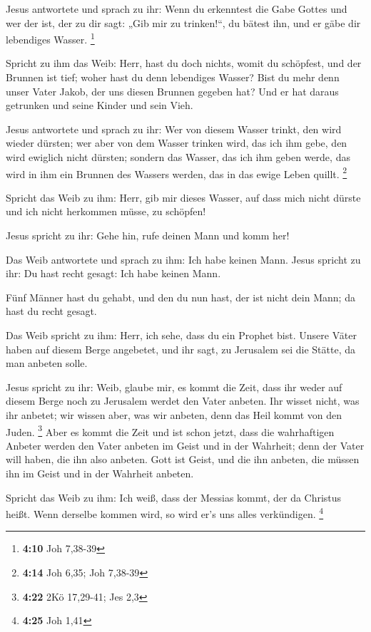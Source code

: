  Jesus antwortete und sprach zu ihr: Wenn du erkenntest
die Gabe Gottes und wer der ist, der zu dir sagt: „Gib mir zu
trinken!{}``, du bätest ihn, und er gäbe dir lebendiges Wasser.
\footnote{\textbf{4:10} Joh 7,38-39}

 Spricht zu ihm das Weib: Herr, hast du doch nichts,
womit du schöpfest, und der Brunnen ist tief; woher hast du denn
lebendiges Wasser?  Bist du mehr denn unser Vater Jakob,
der uns diesen Brunnen gegeben hat? Und er hat daraus getrunken und
seine Kinder und sein Vieh.

 Jesus antwortete und sprach zu ihr: Wer von diesem
Wasser trinkt, den wird wieder dürsten;  wer aber von dem
Wasser trinken wird, das ich ihm gebe, den wird ewiglich nicht dürsten;
sondern das Wasser, das ich ihm geben werde, das wird in ihm ein Brunnen
des Wassers werden, das in das ewige Leben quillt. \footnote{\textbf{4:14}
  Joh 6,35; Joh 7,38-39}

 Spricht das Weib zu ihm: Herr, gib mir dieses Wasser,
auf dass mich nicht dürste und ich nicht herkommen müsse, zu schöpfen!

 Jesus spricht zu ihr: Gehe hin, rufe deinen Mann und
komm her!

 Das Weib antwortete und sprach zu ihm: Ich habe keinen
Mann. Jesus spricht zu ihr: Du hast recht gesagt: Ich habe keinen Mann.

 Fünf Männer hast du gehabt, und den du nun hast, der ist
nicht dein Mann; da hast du recht gesagt.

 Das Weib spricht zu ihm: Herr, ich sehe, dass du ein
Prophet bist.  Unsere Väter haben auf diesem Berge
angebetet, und ihr sagt, zu Jerusalem sei die Stätte, da man anbeten
solle.

 Jesus spricht zu ihr: Weib, glaube mir, es kommt die
Zeit, dass ihr weder auf diesem Berge noch zu Jerusalem werdet den Vater
anbeten.  Ihr wisset nicht, was ihr anbetet; wir wissen
aber, was wir anbeten, denn das Heil kommt von den Juden. \footnote{\textbf{4:22}
  2Kö 17,29-41; Jes 2,3}  Aber es kommt die Zeit und ist
schon jetzt, dass die wahrhaftigen Anbeter werden den Vater anbeten im
Geist und in der Wahrheit; denn der Vater will haben, die ihn also
anbeten.  Gott ist Geist, und die ihn anbeten, die müssen
ihn im Geist und in der Wahrheit anbeten.

 Spricht das Weib zu ihm: Ich weiß, dass der Messias
kommt, der da Christus heißt. Wenn derselbe kommen wird, so wird er's
uns alles verkündigen. \footnote{\textbf{4:25} Joh 1,41}

